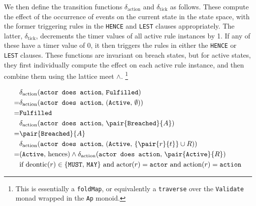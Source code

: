 \documentclass{article}
\begin{document}




We then define the transition functions $\delta_\text{action}$ and
$\delta_\text{tick}$ as follows.
These compute the effect of the occurrence of events on the current state
in the state space, with the former triggering rules in the \texttt{HENCE} and
\texttt{LEST} clauses appropriately.
The latter, $\delta_\text{tick}$, decrements the timer values of all active rule
instances by 1.
If any of these have a timer value of 0, it then triggers the rules in either
the \texttt{HENCE} or \texttt{LEST} clauses.
These functions are invariant on breach states, but for
active states, they first individually compute the effect on each active rule
instance, and then combine them using the lattice meet $\wedge$.
\footnote{
  This is essentially a
  \texttt{foldMap}, or equivalently a \texttt{traverse} over the
  \texttt{Validate} monad wrapped in the \texttt{Ap} monoid.
}

\begin{align*}
  & \delta_\text{action}(
    \texttt{actor does action}, \,
    \texttt{Fulfilled}
  )
  \\
  = & \delta_\text{action}(
    \texttt{actor does action}, \,
    (\texttt{Active}, \, \emptyset)
  )
  \\
  = & \texttt{Fulfilled}
  \\
  & \delta_\text{action}(
    \texttt{actor does action}, \,
    \pair{\texttt{Breached}}{A}
  )
  \\
  = & \pair{\texttt{Breached}}{A}
  \\
  & \delta_\text{action}(
    \texttt{actor does action}, \,
    (
      \texttt{Active}, \,
      \{\pair{r}{t}\} \cup R
    )
  )
  \\
  = &
  (
    \texttt{Active}, \,
    \text{hences}
  )
  \wedge
  \delta_\text{action}(\texttt{actor does action}, \, \pair{\texttt{Active}}{R})
  \\
  & \text{if deontic}(r) \in \{\texttt{MUST}, \, \texttt{MAY}\}
  \text{ and } \text{actor}(r) = \texttt{actor}
  \text{ and } \text{action}(r) = \texttt{action}
\end{align*}
\end{document}
